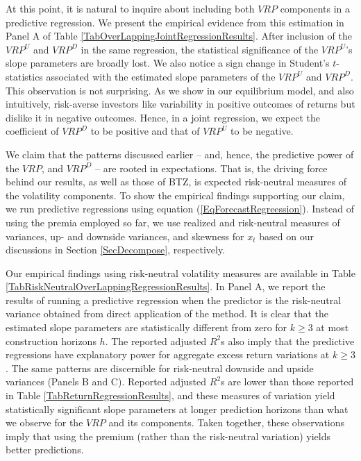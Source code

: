 \documentclass[11pt]{article}
\begin{document}
At this point, it is natural to inquire about including both $VRP$ components in a predictive regression. We present the empirical evidence from this estimation in Panel A of Table \ref{TabOverLappingJointRegressionResults}. After inclusion of the $VRP^{U}$ and $VRP^{D}$ in the same regression, the statistical significance of the $VRP^{U}$'s slope parameters are broadly lost. We also notice a sign change in Student's $t$-statistics associated with the estimated slope parameters of the $VRP^{U}$ and $VRP^{D}$. This observation is not surprising. As we show in our equilibrium model, and also intuitively, risk-averse investors like variability in positive outcomes of returns but dislike it in negative outcomes. Hence, in a joint regression, we expect the coefficient of $VRP^{D}$ to be positive and that of $VRP^{U}$ to be negative.

We claim that the patterns discussed earlier -- and, hence, the predictive power of the $VRP$, and $VRP^{D}$ -- are rooted in expectations. That is, the driving force behind our results, as well as those of BTZ, is expected risk-neutral measures of the volatility components. To show the empirical findings supporting our claim, we run predictive regressions using equation (\ref{EqForecastRegreession}). Instead of using the premia employed so far, we use realized and risk-neutral measures of variances, up- and downside variances, and skewness for $x_t$ based on our discussions in Section \ref{SecDecompose}, respectively.

Our empirical findings using risk-neutral volatility measures are available in Table \ref{TabRiskNeutralOverLappingRegressionResults}. In Panel A, we report the results of running a predictive regression when the predictor is the risk-neutral variance obtained from direct application of the \cite{AndersenBondarenko07} method. It is clear that the estimated slope parameters are statistically different from zero for $k\geq3$ at most construction horizons $h$. The reported adjusted $R^2$s also imply that the predictive regressions have explanatory power for aggregate excess return variations at $k\geq 3$. The same patterns are discernible for risk-neutral downside and upside variances (Panels B and C). Reported adjusted $R^2$s  are lower than those reported in Table  \ref{TabReturnRegressionResults}, and these measures of variation yield statistically significant slope parameters at longer prediction horizons than what we observe for the $VRP$ and its components. Taken together, these observations imply that using the premium (rather than the risk-neutral variation) yields better predictions.
\end{document}
